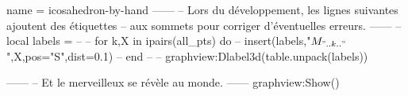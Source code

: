 \documentclass[border = 3pt]{standalone}
\begin{document}
\begin{luadraw}{name = icosahedron-by-hand}
------
-- Lors du développement, les lignes suivantes ajoutent des étiquettes
-- aux sommets pour corriger d'éventuelles erreurs.
------
-- local labels = {}
--
-- for k,X in ipairs(all_pts) do
--   insert(labels,{"$M_{"..k.."}$",X,{pos="S",dist=0.1}})
-- end
--
-- graphview:Dlabel3d(table.unpack(labels))

------
-- Et le merveilleux se révèle au monde.
------
graphview:Show()
\end{luadraw}
\end{document}
